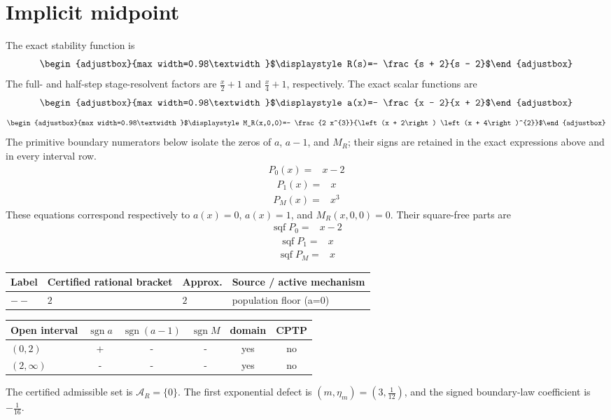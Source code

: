 \section{Implicit midpoint}
The exact stability function is
\[\begin{adjustbox}{max width=0.98\textwidth}$\displaystyle R(s)=- \frac{s + 2}{s - 2}$\end{adjustbox}\]
The full- and half-step stage-resolvent factors are $\frac{x}{2} + 1$ and $\frac{x}{4} + 1$, respectively.
The exact scalar functions are
\[\begin{adjustbox}{max width=0.98\textwidth}$\displaystyle a(x)=- \frac{x - 2}{x + 2}$\end{adjustbox}\]
\[\begin{adjustbox}{max width=0.98\textwidth}$\displaystyle M_R(x,0,0)=- \frac{2 x^{3}}{\left(x + 2\right) \left(x + 4\right)^{2}}$\end{adjustbox}\]
The primitive boundary numerators below isolate the zeros of $a$, $a-1$, and $M_R$; their signs are retained in the exact expressions above and in every interval row.
\[\begin{aligned}
P_0(x)={}&x-2
\end{aligned}\]
\[\begin{aligned}
P_1(x)={}&x
\end{aligned}\]
\[\begin{aligned}
P_M(x)={}&x^{3}
\end{aligned}\]
These equations correspond respectively to $a(x)=0$, $a(x)=1$, and $M_R(x,0,0)=0$. Their square-free parts are
\[\begin{aligned}
\operatorname{sqf}P_0={}&x-2
\end{aligned}\]
\[\begin{aligned}
\operatorname{sqf}P_1={}&x
\end{aligned}\]
\[\begin{aligned}
\operatorname{sqf}P_M={}&x
\end{aligned}\]
\begin{center}
\begin{tabularx}{\textwidth}{@{}l l l X@{}}
\toprule
Label & Certified rational bracket & Approx. & Source / active mechanism \\
\midrule
$--$ & $2$ & $2$ & population floor (a=0) \\
\bottomrule
\end{tabularx}
\end{center}
\begin{center}
\begin{tabular}{@{}l c c c c c@{}}
\toprule
Open interval & $\operatorname{sgn}a$ & $\operatorname{sgn}(a-1)$ & $\operatorname{sgn}M$ & domain & CPTP \\
\midrule
$(0,2)$ & + & - & - & yes & no \\
$(2,\infty)$ & - & - & - & yes & no \\
\bottomrule
\end{tabular}
\end{center}
The certified admissible set is $\mathcal A_R=\{0\}$. The first exponential defect is $(m,\eta_m)=(3,\frac{1}{12})$, and the signed boundary-law coefficient is $- \frac{1}{16}$.

